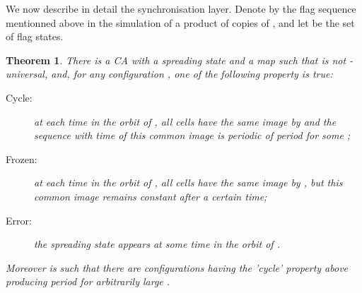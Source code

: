 \documentclass[a4paper]{elsarticle}
\newtheorem{thm}{Theorem}[section]
\begin{document}
We now describe in detail the synchronisation layer.  Denote by
 the flag sequence mentionned above in the simulation of
a product of  copies of , and let  be the set of flag
states.

\begin{thm}
  \label{thm:metronome}
  There is a CA  with a spreading state  and a map  such that  is not
  -universal, and, for any configuration
  , one of the following property is true:
  \begin{description}
  \item[Cycle:] at each time in the orbit of , all cells have the
    same image by  and the sequence with time of this common
    image is periodic of period  for some ;
  \item[Frozen:] at each time in the orbit of , all cells have the
    same image by , but this common image remains constant after
    a certain time;
  \item[Error:] the spreading state appears at some time in the orbit
    of .
  \end{description}
  Moreover  is such that there are configurations having the
  'cycle' property above producing period  for
  arbitrarily large .
\end{thm}
\end{document}

